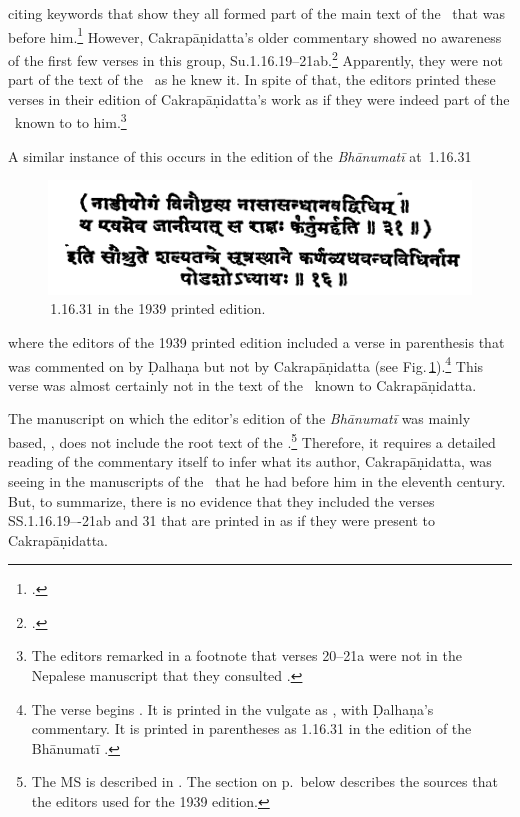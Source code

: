 citing keywords that show they all
formed part of the main text of the \SS\ that was before
him.\footnote{.} However, Cakrapāṇidatta's older
commentary showed no awareness of the first few verses in this group,
Su.1.16.19--21ab.\footcite[130--131]{acar-1939}  Apparently, they were not part of
the text of the \SS\ as he knew it.  In spite of that, the editors printed these
verses in their edition of Cakrapāṇidatta's work as if they were indeed part of
the \SS\ known to to him.\footnote{The editors remarked in a footnote that verses
20--21a were not in the Nepalese manuscript that they consulted \citep[130,
n.\,2]{acar-1939}.}

A similar instance of this occurs in the edition of the \emph{Bhānumatī} at \SS\,1.16.31 
\begin{figure}[t]
    \centering
    \includegraphics[width=.75\linewidth]{media/nadiyogam}
    \caption{\SS\,1.16.31 in the 1939 printed edition.}
    \label{fig:nadiyogam}
\end{figure}
where the editors of the 1939 printed edition included a verse in parenthesis that was
commented on by Ḍalhaṇa but not by Cakrapāṇidatta (see 
Fig.\,\ref{fig:nadiyogam}).\footnote{The verse begins 
.  It is printed in the vulgate as 
, with Ḍalhaṇa's commentary.  It is printed in parentheses as 1.16.31 in the 
edition of the Bhānumatī \citep[133]{acar-1939}.} This verse was almost certainly not in the 
text of the \SS\ known to Cakrapāṇidatta. 



The manuscript on which the editor's edition of the \emph{Bhānumatī} was
mainly based,  , does not include the root text of 
the \SS.\footnote{%
The MS is described in \cite[vol.\,1.5, 928, \#2647]{egge-1887}. 
The section on p.\,\pageref{1939edition} below describes the sources that the editors used 
for the 1939 edition.}  Therefore, it requires a detailed reading  of the commentary itself to 
infer what its author, Cakrapāṇidatta, was seeing in the manuscripts of the \SS\ that he had 
before him in the eleventh century.  But, to summarize, there is no evidence that they  
included the verses SS.1.16.19–-21ab and 31 that are printed in \cite{acar-1939} as if they 
were present to Cakrapāṇidatta. 

